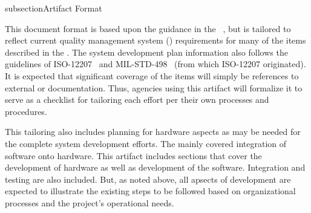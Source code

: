 
subsection{Artifact Format}
\label{loc:DocOverview_ArtifactFormat}

This document format is based upon the guidance in the \SDP \DID~\cite{ref__SVD_DID}, but is tailored to reflect current quality management system (\QMS) requirements for many of the items described in the \DID.
The system development plan information also follows the guidelines of ISO-12207~\cite{ref__ISO_12207} and MIL-STD-498~\cite{ref__MIL_STD_498} (from which ISO-12207 originated).
It is expected that significant coverage of the \SDP \DID items will simply be references to external \QMS or \CMMI documentation.
Thus, agencies using this artifact will formalize it to serve as a checklist for tailoring each effort per their own processes and procedures.

This tailoring also includes planning for hardware aspects as may be needed for the complete system development efforts.
The \SDP \DID mainly covered integration of software onto hardware.
This artifact includes sections that cover the development of hardware as well as development of the software.
Integration and testing are also included.
But, as noted above, all apsects of development are expected to illustrate the existing \QMS steps to be followed based on organizational processes and the project's operational needs.

